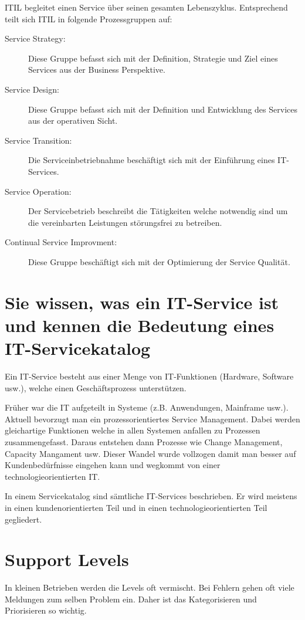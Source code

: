 ITIL begleitet einen Service über seinen gesamten Lebenszyklus. Entsprechend teilt sich ITIL in folgende Prozessgruppen auf:
\begin{description}
	\item[Service Strategy:] Diese Gruppe befasst sich mit der Definition, Strategie und Ziel eines Services aus der Business Perspektive.
	\item[Service Design:] Diese Gruppe befasst sich mit der Definition und Entwicklung des Services aus der operativen Sicht.
	\item[Service Transition:] Die Serviceinbetriebnahme beschäftigt sich mit der Einführung eines IT-Services.
	\item[Service Operation:] Der Servicebetrieb beschreibt die Tätigkeiten welche notwendig sind um die vereinbarten Leistungen störungsfrei zu betreiben.
	\item[Continual Service Improvment:] Diese Gruppe beschäftigt sich mit der Optimierung der Service Qualität.
\end{description}

\section{Sie wissen, was ein IT-Service ist und kennen die Bedeutung eines IT-Servicekatalog}

Ein IT-Service besteht aus einer Menge von IT-Funktionen (Hardware, Software usw.), welche einen Geschäftsprozess unterstützen. 

Früher war die IT aufgeteilt in Systeme (z.B. Anwendungen, Mainframe usw.). Aktuell bevorzugt man ein prozessorientiertes Service Management. Dabei werden gleichartige Funktionen welche in allen Systemen anfallen zu Prozessen zusammengefasst. Daraus entstehen dann Prozesse wie Change Management, Capacity Mangament usw. Dieser Wandel wurde vollzogen damit man besser auf Kundenbedürfnisse eingehen kann und wegkommt von einer technologieorientierten IT.

In einem Servicekatalog sind sämtliche IT-Services beschrieben. Er wird meistens in einen kundenorientierten Teil und in einen technologieorientierten Teil gegliedert.

\section{Support Levels}
In kleinen Betrieben werden die Levels oft vermischt.
Bei Fehlern gehen oft viele Meldungen zum selben Problem ein. Daher ist das Kategorisieren und Priorisieren so wichtig.
